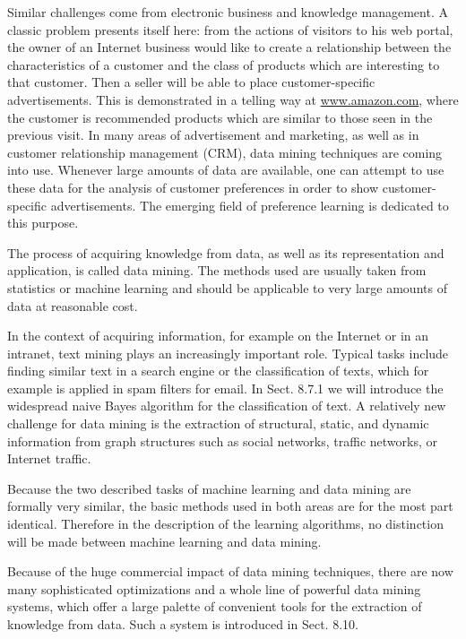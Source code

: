 \documentclass[10pt]{book}
\begin{document}
\begin{center}
\begin{enumerate}
\begin{center}
Similar challenges come from electronic business and knowledge management. A classic problem presents itself here: from the actions of visitors to his web portal, the owner of an Internet business would like to create a relationship between the characteristics of a customer and the class of products which are interesting to that customer. Then a seller will be able to place customer-specific advertisements. This is demonstrated in a telling way at \href{http://www.amazon.com}{www.amazon.com}, where the customer is recommended products which are similar to those seen in the previous visit. In many areas of advertisement and marketing, as well as in customer relationship management (CRM), data mining techniques are coming into use. Whenever large amounts of data are available, one can attempt to use these data for the analysis of customer preferences in order to show customer-specific advertisements. The emerging field of preference learning is dedicated to this purpose.

The process of acquiring knowledge from data, as well as its representation and application, is called data mining. The methods used are usually taken from statistics or machine learning and should be applicable to very large amounts of data at reasonable cost.

In the context of acquiring information, for example on the Internet or in an intranet, text mining plays an increasingly important role. Typical tasks include finding similar text in a search engine or the classification of texts, which for example is applied in spam filters for email. In Sect. 8.7.1 we will introduce the widespread naive Bayes algorithm for the classification of text. A relatively new challenge for data mining is the extraction of structural, static, and dynamic information from graph structures such as social networks, traffic networks, or Internet traffic.

Because the two described tasks of machine learning and data mining are formally very similar, the basic methods used in both areas are for the most part identical. Therefore in the description of the learning algorithms, no distinction will be made between machine learning and data mining.

Because of the huge commercial impact of data mining techniques, there are now many sophisticated optimizations and a whole line of powerful data mining systems, which offer a large palette of convenient tools for the extraction of knowledge from data. Such a system is introduced in Sect. 8.10.


\end{center}
\end{enumerate}
\end{center}
\end{document}
